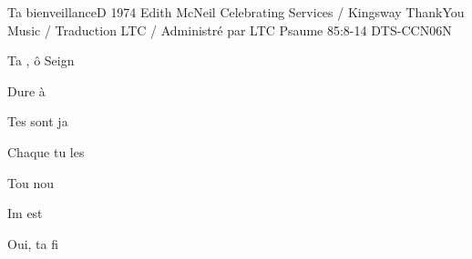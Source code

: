 \begin{song}{Ta bienveillance}{D}
  {1974 Edith McNeil}
  {Celebrating Services / Kingsway ThankYou Music / Traduction LTC / Administr\'e par LTC}
  {Psaume 85:8-14}
  {DTS-CCN06N}




\begin{SBOpGroup}

Ta , \^o Seign 

Dure \`a 

Tes   sont ja 

Chaque  tu les 

Tou nou

Im est  

Oui, ta fi

\end{SBOpGroup}


\end{song}
